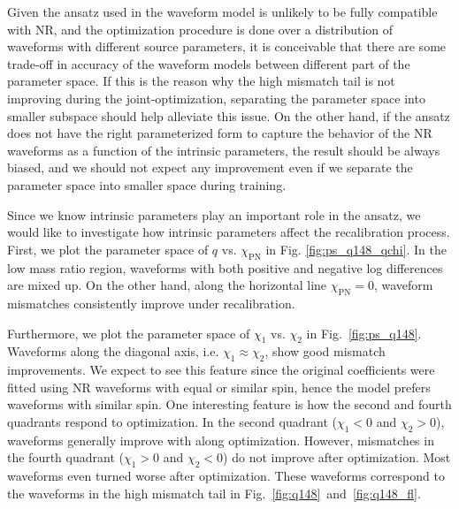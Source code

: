 \documentclass[twocolumn]{aastex631}
\begin{document}

Given the ansatz used in the waveform model is unlikely to be fully compatible with NR, and the optimization procedure is done over a distribution of waveforms with different source parameters, it is conceivable that there are some trade-off in accuracy of the waveform models between different part of the parameter space. If this is the reason why the high mismatch tail is not improving during the joint-optimization, separating the parameter space into smaller subspace should help alleviate this issue. On the other hand, if the ansatz does not have the right parameterized form to capture the behavior of the NR waveforms as a function of the intrinsic parameters, the result should be always biased, and we should not expect any improvement even if we separate the parameter space into smaller space during training.

Since we know intrinsic parameters play an important role in the ansatz, we would like to investigate how intrinsic parameters affect the recalibration process. First, we plot the parameter space of $q$ vs. $\chi_{\mathrm{PN}}$ in Fig. \ref{fig:ps_q148_qchi}. In the low mass ratio region, waveforms with both positive and negative log differences are mixed up. On the other hand, along the horizontal line $\chi_{\mathrm{PN}}=0$, waveform mismatches consistently improve under recalibration. 

Furthermore, we plot the parameter space of $\chi_1$ vs. $\chi_2$ in Fig.~\ref{fig:ps_q148}. Waveforms along the diagonal axis, i.e. $\chi_1\approx\chi_2$, show good mismatch improvements. We expect to see this feature since the original coefficients were fitted using NR waveforms with equal or similar spin, hence the model prefers waveforms with similar spin. One interesting feature is how the second and fourth quadrants respond to optimization. In the second quadrant ($\chi_1<0$ and $\chi_2>0$), waveforms generally improve with along optimization. However, mismatches in the fourth quadrant ($\chi_1>0$ and $\chi_2<0$) do not improve after optimization. Most waveforms even turned worse after optimization. These waveforms correspond to the waveforms in the high mismatch tail in Fig.~\ref{fig:q148}~and~\ref{fig:q148_fl}. 
\end{document}
